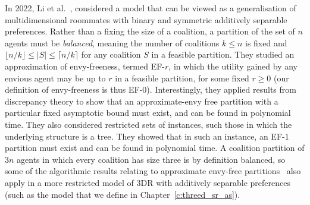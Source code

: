 In 2022, Li et al.~\cite{Li2022}, considered a model that can be viewed as a generalisation of multidimensional roommates with binary and symmetric additively separable preferences. Rather than a fixing the size of a coalition, a partition of the set of $n$ agents must be \emph{balanced}, meaning the number of coalitions $k\leq n$ is fixed and $\lfloor n/k \rfloor \leq |S| \leq \lceil n/k \rceil$ for any coalition $S$ in a feasible partition. They studied an approximation of envy-freeness, termed EF-$r$, in which the utility gained by any envious agent may be up to $r$ in a feasible partition, for some fixed $r \geq 0$ (our definition of envy-freeness is thus EF-$0$). Interestingly, they applied results from discrepancy theory to show that an approximate-envy free partition with a particular fixed asymptotic bound must exist, and can be found in polynomial time. They also considered restricted sets of instances, such those in which the underlying structure is a tree. They showed that in such an instance, an EF-$1$ partition must exist and can be found in polynomial time. A coalition partition of $3n$ agents in which every coalition has size three is by definition balanced, so some of the algorithmic results relating to approximate envy-free partitions~\cite[Theorems~9 and~10]{Li2022} also apply in a more restricted model of 3DR with additively separable preferences (such as the model that we define in Chapter~\ref{c:threed_sr_as}).

